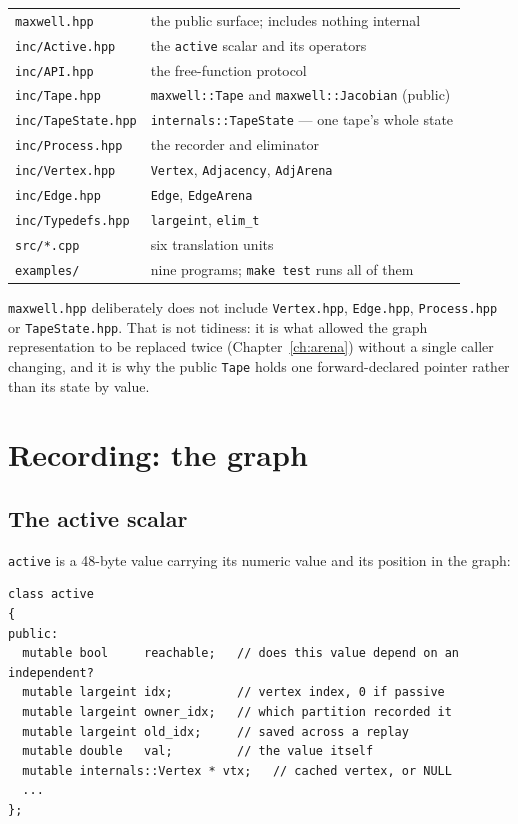 \documentclass[11pt,a4paper]{report}
\newcommand{\code}[1]{\texttt{#1}}
\begin{document}
\begin{center}
\begin{tabular}{@{}ll@{}}
\toprule
\code{maxwell.hpp}            & the public surface; includes nothing internal \\
\code{inc/Active.hpp}         & the \code{active} scalar and its operators \\
\code{inc/API.hpp}            & the free-function protocol \\
\code{inc/Tape.hpp}           & \code{maxwell::Tape} and \code{maxwell::Jacobian} (public) \\
\code{inc/TapeState.hpp}      & \code{internals::TapeState} --- one tape's whole state \\
\code{inc/Process.hpp}        & the recorder and eliminator \\
\code{inc/Vertex.hpp}         & \code{Vertex}, \code{Adjacency}, \code{AdjArena} \\
\code{inc/Edge.hpp}           & \code{Edge}, \code{EdgeArena} \\
\code{inc/Typedefs.hpp}       & \code{largeint}, \code{elim\_t} \\
\code{src/*.cpp}              & six translation units \\
\code{examples/}              & nine programs; \code{make test} runs all of them \\
\bottomrule
\end{tabular}
\end{center}

\noindent
\code{maxwell.hpp} deliberately does not include \code{Vertex.hpp},
\code{Edge.hpp}, \code{Process.hpp} or \code{TapeState.hpp}. That is not
tidiness: it is what allowed the graph representation to be replaced twice
(Chapter~\ref{ch:arena}) without a single caller changing, and it is why the
public \code{Tape} holds one forward-declared pointer rather than its state by
value.

\chapter{Recording: the graph}
\label{ch:graph}

\section{The active scalar}

\code{active} is a 48-byte value carrying its numeric value and its position in
the graph:

\begin{lstlisting}
class active
{
public:
  mutable bool     reachable;   // does this value depend on an independent?
  mutable largeint idx;         // vertex index, 0 if passive
  mutable largeint owner_idx;   // which partition recorded it
  mutable largeint old_idx;     // saved across a replay
  mutable double   val;         // the value itself
  mutable internals::Vertex * vtx;   // cached vertex, or NULL
  ...
};
\end{lstlisting}
\end{document}
